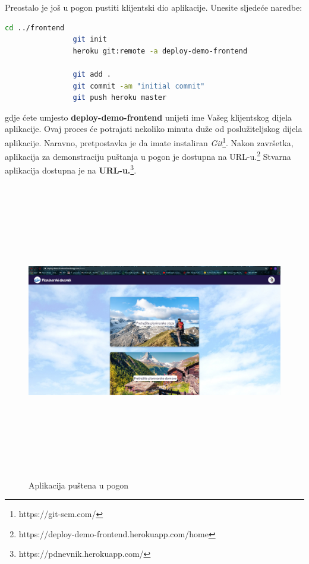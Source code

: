 			Preostalo je još u pogon pustiti klijentski dio aplikacije. Unesite sljedeće naredbe:
			\begin{lstlisting}[language=bash]
				cd ../frontend
				git init
				heroku git:remote -a deploy-demo-frontend
				
				git add .
				git commit -am "initial commit"
				git push heroku master
			\end{lstlisting}
			gdje ćete umjesto \textbf{deploy-demo-frontend} unijeti ime Vašeg klijentskog dijela aplikacije. Ovaj proces će potrajati nekoliko minuta duže od poslužiteljskog dijela aplikacije. Naravno, pretpostavka je da imate instaliran \textit{Git}\footnote{https://git-scm.com/}.
			Nakon završetka, aplikacija za demonstraciju puštanja u pogon je dostupna na URL-u.\footnote{https://deploy-demo-frontend.herokuapp.com/home}
			Stvarna aplikacija dostupna je na \textbf{URL-u.}\footnote{https://pdnevnik.herokuapp.com/}.
			\begin{figure}[H]
				\includegraphics[width=160mm, height=130mm]{slike/app-end.png} %
				\centering
				\caption{Aplikacija puštena u pogon}
				\label{fig:dijagramdeployment}
			\end{figure}
			\eject 